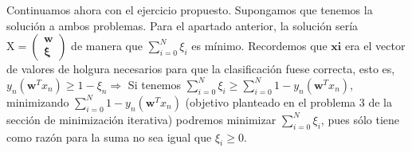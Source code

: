 \documentclass[11pt,leqno]{article}
\theoremstyle{definition}
\begin{document}
\begin{solucion}
Continuamos ahora con el ejercicio propuesto. 
Supongamos que tenemos la solución a ambos problemas. 
Para el apartado anterior, la solución sería $\mathrm{X} = \left( \begin{array}{c} \mathbf{w} \\ \mathbf{\xi} \end{array}\right)$ de manera que $\sum_{i=0}^N \xi_i$ es mínimo. 
Recordemos que $\mathbf{xi}$ era el vector de valores de holgura necesarios para que la clasificación fuese correcta, esto es, $y_n(\mathbf{w}^T x_n) \geq 1 - \xi_n \Rightarrow$ 
Si tenemos $\sum_{i=0}^N \xi_i \geq \sum_{i=0}^N 1-y_n(\mathbf{w}^T x_n)$, minimizando $\sum_{i=0}^N 1-y_n(\mathbf{w}^T x_n)$ (objetivo planteado en el problema 3 de la sección de minimización iterativa) podremos minimizar  $\sum_{i=0}^N \xi_i$, pues sólo tiene como razón para la suma no sea igual que $\xi_i \geq 0$.
\end{solucion}
\end{document}

